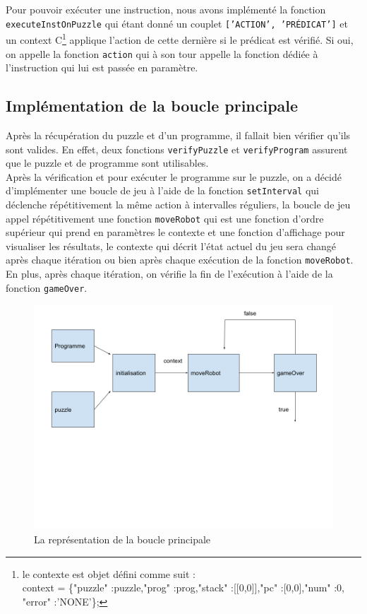 \documentclass[11pt]{article}
\begin{document}
Pour pouvoir exécuter une instruction, nous avons implémenté la fonction\\ \texttt{executeInstOnPuzzle} qui étant donné un couplet \texttt{['ACTION', 'PRÉDICAT']} et un context C\footnote{le contexte est objet défini comme suit :\\context = \{"puzzle" :puzzle,"prog" :prog,"stack" :[[0,0]],"pc" :[0,0],"num" :0, "error" :'NONE'\}; } applique l'action de cette dernière si le prédicat est vérifié. Si oui, on appelle la fonction \texttt{action} qui à son
tour appelle la fonction dédiée à l'instruction qui lui est passée en paramètre. 
\subsection{Implémentation de la boucle principale}
Après la récupération du puzzle et d'un programme, il fallait bien vérifier qu'ils sont valides. En effet, deux fonctions \texttt{verifyPuzzle} et \texttt{verifyProgram} assurent que le puzzle et de programme sont utilisables.\\
Après la vérification et pour exécuter le programme sur le puzzle, on a décidé d'implémenter une boucle de jeu à l'aide de la fonction \texttt{setInterval} qui déclenche répétitivement la même action à intervalles réguliers, la boucle de jeu appel répétitivement une fonction \texttt{moveRobot} qui est une fonction d'ordre supérieur qui prend en paramètres le contexte et une fonction d'affichage pour visualiser les résultats, le contexte qui décrit l'état actuel du jeu sera changé après chaque itération ou bien après chaque exécution de la fonction \texttt{moveRobot}.\\
En plus, après chaque itération, on vérifie la fin de l'exécution à l'aide de la fonction \texttt{gameOver}.
\begin{figure}[h!]
    \centering
    \includegraphics[scale=0.3]{dessin.png}
    \caption{La représentation de la boucle principale}
\end{figure}
\end{document}
